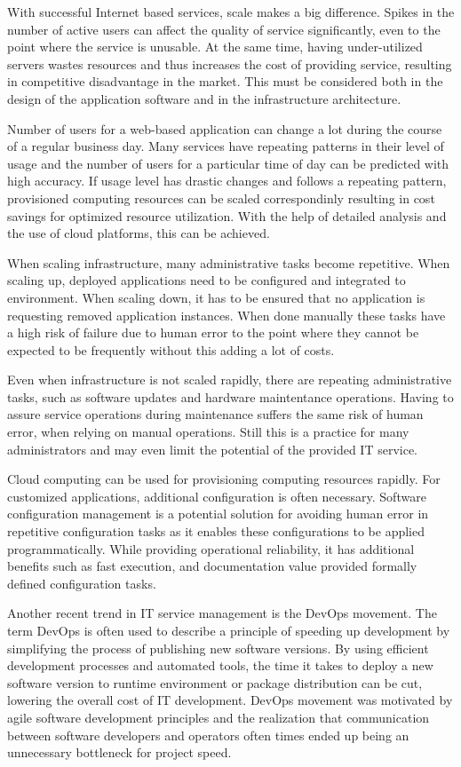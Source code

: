 With successful Internet based services, scale makes a big difference. Spikes
in the number of active users can affect the quality of service significantly,
even to the point where the service is unusable. At the same time, having
under-utilized servers wastes resources and thus increases the cost of
providing service, resulting in competitive disadvantage in the market. This
must be considered both in the design of the application software and in the
infrastructure architecture.

Number of users for a web-based application can change a lot during the course
of a regular business day. Many services have repeating patterns in their
level of usage and the number of users for a particular time of day can be
predicted with high accuracy. If usage level has drastic changes and follows a
repeating pattern, provisioned computing resources can be scaled correspondinly
resulting in cost savings for optimized resource utilization. With the help of
detailed analysis and the use of cloud platforms, this can be achieved.

When scaling infrastructure, many administrative tasks become repetitive. When
scaling up, deployed applications need to be configured and integrated to
environment. When scaling down, it has to be ensured that no application is
requesting removed application instances. When done manually these tasks have a
high risk of failure due to human error to the point where they cannot be
expected to be frequently without this adding a lot of costs.

Even when infrastructure is not scaled rapidly, there are repeating
administrative tasks, such as software updates and hardware maintentance
operations. Having to assure service operations during maintenance suffers the
same risk of human error, when relying on manual operations. Still this is a
practice for many administrators and may even limit the potential of the
provided IT service.

Cloud computing can be used for provisioning computing resources rapidly. For
customized applications, additional configuration is often necessary. Software
configuration management is a potential solution for avoiding human error in
repetitive configuration tasks as it enables these configurations to be applied
programmatically. While providing operational reliability, it has additional
benefits such as fast execution, and documentation value provided formally
defined configuration tasks.

Another recent trend in IT service management is the DevOps movement. The term
DevOps is often used to describe a principle of speeding up development by
simplifying the process of publishing new software versions. By using efficient
development processes and automated tools, the time it takes to
deploy a new software version to runtime environment or package distribution
can be cut, lowering the overall cost of IT development. DevOps movement was
motivated by agile software development principles and the realization that
communication between software developers and operators often times ended up
being an unnecessary bottleneck for project speed.

